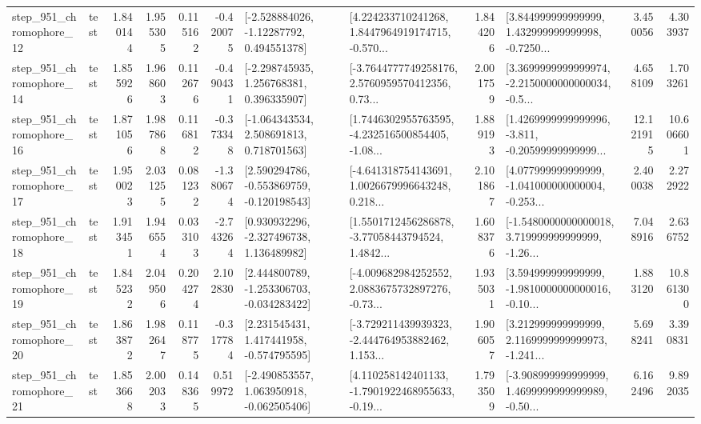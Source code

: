 \begin{tabular}{llrrrrllrlrr}
  step\_951\_chromophore\_12 &      test &      1.840144 &    1.955305 &      0.115162 & -0.420075 &    [-2.528884026, -1.12287792, 0.494551378] &  [4.224233710241268, 1.8447964919174715, -0.570... &       1.844206 &  [3.844999999999999, 1.432999999999998, -0.7250... &            3.450056 &          4.303937 \\
  step\_951\_chromophore\_14 &      test &      1.855926 &    1.968603 &      0.112676 & -0.490431 &    [-2.298745935, 1.256768381, 0.396335907] &  [-3.7644777749258176, 2.5760959570412356, 0.73... &       2.001759 &  [3.3699999999999974, -2.2150000000000034, -0.5... &            4.658109 &          1.703261 \\
  step\_951\_chromophore\_16 &      test &      1.871056 &    1.987868 &      0.116812 & -0.373348 &    [-1.064343534, 2.508691813, 0.718701563] &  [1.7446302955763595, -4.232516500854405, -1.08... &       1.889193 &  [1.4269999999999996, -3.811, -0.20599999999999... &           12.121915 &         10.606601 \\
  step\_951\_chromophore\_17 &      test &      1.950023 &    2.031255 &      0.081232 & -1.380674 &   [2.590294786, -0.553869759, -0.120198543] &  [-4.641318754143691, 1.0026679996643248, 0.218... &       2.101867 &  [4.077999999999999, -1.041000000000004, -0.253... &            2.400038 &          2.272922 \\
  step\_951\_chromophore\_18 &      test &      1.913451 &    1.946554 &      0.033103 & -2.743264 &    [0.930932296, -2.327496738, 1.136489982] &  [1.5501712456286878, -3.77058443794524, 1.4842... &       1.608376 &  [-1.5480000000000018, 3.719999999999999, -1.26... &            7.048916 &          2.636752 \\
  step\_951\_chromophore\_19 &      test &      1.845232 &    2.049506 &      0.204274 &  2.102830 &   [2.444800789, -1.253306703, -0.034283422] &  [-4.009682984252552, 2.0883675732897276, -0.73... &       1.935031 &  [3.594999999999999, -1.9810000000000016, -0.10... &            1.883120 &         10.861300 \\
  step\_951\_chromophore\_20 &      test &      1.863872 &    1.982647 &      0.118775 & -0.317784 &    [2.231545431, 1.417441958, -0.574795595] &  [-3.729211439939323, -2.444764953882462, 1.153... &       1.906057 &  [3.212999999999999, 2.1169999999999973, -1.241... &            5.698241 &          3.390831 \\
  step\_951\_chromophore\_21 &      test &      1.853668 &    2.002033 &      0.148365 &  0.519972 &   [-2.490853557, 1.063950918, -0.062505406] &  [4.110258142401133, -1.7901922468955633, -0.19... &       1.793509 &  [-3.908999999999999, 1.4699999999999989, -0.50... &            6.162496 &          9.892035 \\

\end{tabular}
